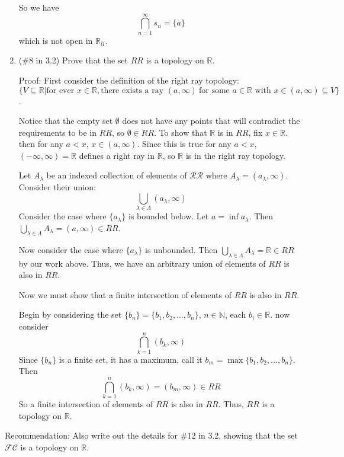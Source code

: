 \documentclass[12pt]{article}
\begin{document}
\begin{enumerate}
So we have
\[\bigcap_{n=1}^{\infty}  s_n = \{a\}\]
which is not open in $\mathbb{R_{\mathcal{U}}}$.




\item (\#8 in 3.2) Prove that the set $RR$ is a topology on $\mathbb{R}$.

Proof: First consider the definition of the right ray topology: $\{V \subseteq \mathbb{R} | \text{for ever } x\in \mathbb{R},\text{there exists a ray } (a, \infty)\: \text{for some } a \in \mathbb{R} \text{ with } x \in (a, \infty) \subseteq V\}$. 

Notice that the empty set $\emptyset$ does not have any points that will contradict the requirements to be in $RR$, so $\emptyset \in RR$. 
To show that $\mathbb{R}$ is in $RR$, fix $x \in \mathbb{R}$. then for any $a < x$, $x \in (a, \infty)$. 
Since this is true for any $a < x$, $(-\infty, \infty) = \mathbb{R}$ defines a right ray in $\mathbb{R}$, so $\mathbb{R}$ is in the right ray topology.

Let $A_{\lambda}$ be an indexed collection of elements of $\mathcal{RR}$ where $A_{\lambda} = (a_{\lambda}, \infty)$. Consider their union:
\[\bigcup_{\lambda \in \Lambda} (a_{\lambda}, \infty)\]
Consider the case where $\{a_{\lambda}\}$ is bounded below. Let $a = \inf a_{\lambda}$. Then $\bigcup_{\lambda \in \Lambda} A_{\lambda} = (a, \infty) \in RR$. 

Now consider the case where $\{a_{\lambda}\}$ is unbounded. Then $\bigcup_{\lambda \in \Lambda} A_{\lambda} = \mathbb{R} \in RR$ by our work above. Thus, we have an arbitrary union of elements of $RR$ is also in $RR$. 

Now we must show that a finite intersection of elements of $RR$ is also in $RR$. 

Begin by considering the set $\{b_n\} = \{b_1, b_2, \ldots, b_n\}$, $n \in \mathbb{N}$, each $b_i \in \mathbb{R}$. now consider
\[\bigcap_{k=1}^n (b_k, \infty)\]
Since $\{b_n\}$ is a finite set, it has a maximum, call it $b_m = \max\{b_1, b_2, \ldots, b_n\}$. Then 
\[\bigcap_{k=1}^n (b_k, \infty) = (b_m, \infty) \in RR\]
So a finite intersection of elements of $RR$ is also in $RR$. Thus, $RR$ is a topology on $\mathbb{R}$.
\end{enumerate}




\noindent Recommendation: Also write out the details for \#12 in 3.2, showing that the set $\mathcal{FC}$ is a topology on $\mathbb{R}$.
\end{document}
